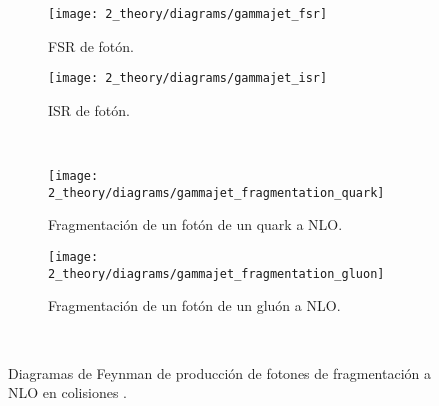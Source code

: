 \begin{figure}[ht!]
    \centering
    \begin{subfigure}[h]{0.49\linewidth}
        \centering
        \texttt{[image: 2\_theory/diagrams/gammajet\_fsr]}
        \caption{\Ac{FSR} de fotón.}
        \label{fig:theory:sm:prompt_photon:feynman_nlo_frag:photon_fsr}
    \end{subfigure}
    \hfill
    \begin{subfigure}[h]{0.49\linewidth}
        \centering
        \texttt{[image: 2\_theory/diagrams/gammajet\_isr]}
        \caption{\Ac{ISR} de fotón.}
        \label{fig:theory:sm:prompt_photon:feynman_nlo_frag:photon_isr}
    \end{subfigure}\\
    \begin{subfigure}[h]{0.49\linewidth}
        \centering
        \texttt{[image: 2\_theory/diagrams/gammajet\_fragmentation\_quark]}
        \caption{Fragmentación de un fotón de un quark a \ac{NLO}.}
        \label{fig:theory:sm:prompt_photon:feynman_nlo_frag:quark}
    \end{subfigure}
    \hfill
    \begin{subfigure}[h]{0.49\linewidth}
        \centering
        \texttt{[image: 2\_theory/diagrams/gammajet\_fragmentation\_gluon]}
        \caption{Fragmentación de un fotón de un gluón a \ac{NLO}.}
        \label{fig:theory:sm:prompt_photon:feynman_nlo_frag:gluon}
    \end{subfigure}\\
    \caption{Diagramas de Feynman de producción de fotones de fragmentación a \ac{NLO} en colisiones \pp.}
    \label{fig:theory:sm:prompt_photon:feynman_nlo_frag}
\end{figure}






